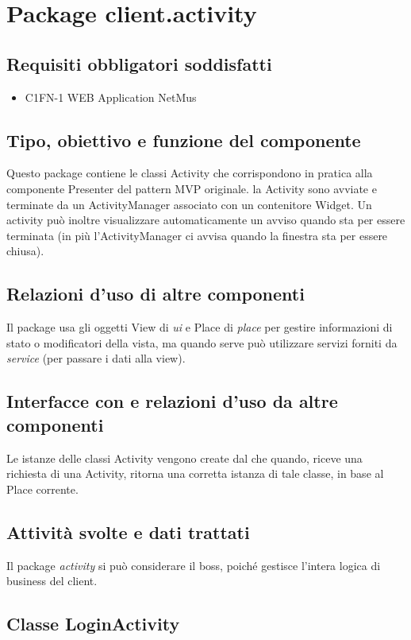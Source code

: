 \newpage
\section{Package client.activity} %
\subsection*{Requisiti obbligatori soddisfatti}
\begin{itemize}
	\item C1FN-1 WEB Application NetMus
\end{itemize}
\subsection*{Tipo, obiettivo e funzione del componente}
Questo package contiene le classi Activity che corrispondono in pratica alla
componente Presenter del pattern MVP originale. la Activity sono avviate e
terminate da un ActivityManager associato con un contenitore Widget. Un activity
pu\`o inoltre visualizzare automaticamente un avviso quando sta per essere
terminata (in pi\`u l'ActivityManager ci avvisa quando la finestra sta per
essere chiusa).

\subsection*{Relazioni d'uso di altre componenti} Il package usa gli oggetti
View di \emph{ui} e Place di \emph{place} per gestire informazioni di stato o
modificatori della vista, ma quando serve pu\`o utilizzare servizi forniti da
\emph{service} (per passare i dati alla view).
\subsection*{Interfacce con e relazioni d'uso da altre componenti} Le istanze
delle classi Activity vengono create dal  che quando,
riceve una richiesta di una Activity, ritorna una corretta istanza di tale
classe, in base al Place corrente.
\subsection*{Attivit\`a svolte e dati trattati} Il package \emph{activity} si
pu\`o considerare il boss, poich\'e gestisce l'intera logica di business del
client.

\subsection{Classe LoginActivity}
